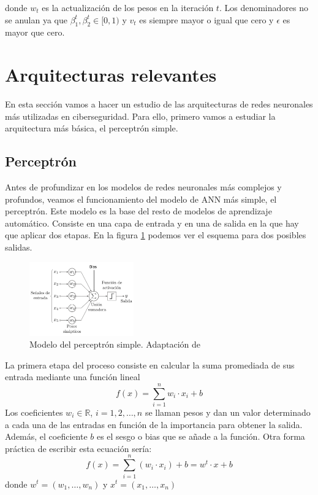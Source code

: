 donde $w_t$ es la actualización de los pesos en la iteración $t$. Los denominadores no se anulan ya que $\beta_1^t,\beta_2^t \in [0, 1)$ y $v_t$ es siempre mayor o igual que cero y $\epsilon$ es mayor que cero.



\section{Arquitecturas relevantes} \label{Subsec: 3_2}

En esta sección vamos a hacer un estudio de las arquitecturas de redes neuronales más utilizadas en ciberseguridad. Para ello, primero vamos a estudiar la arquitectura más básica, el perceptrón simple.

\subsection{Perceptrón}

Antes de profundizar en los modelos de redes neuronales más complejos y profundos, veamos el funcionamiento del modelo de ANN más simple, el perceptrón. Este modelo es la base del resto de modelos de aprendizaje automático. Consiste en una capa de entrada y en una de salida en la que hay que aplicar dos etapas. En la figura \ref{img: perceptron} podemos ver el esquema para dos posibles salidas.

\begin{figure}[h!]
    \centering
    \includegraphics[width=0.4\textwidth]{img/perceptron.png}
    \caption{Modelo del perceptrón simple. Adaptación de \citep{percep}}
    \label{img: perceptron}
\end{figure}

La primera etapa del proceso consiste en calcular la suma promediada de sus entrada mediante una función lineal
\begin{equation}
f(x) = \sum_{i=1}^{n} w_i \cdot x_i + b
\end{equation}
Los coeficientes $w_i \in \mathbb{R}$, $i=1,2, \ldots, n$ se llaman pesos y dan un valor determinado a cada una de las entradas en función de la importancia para obtener la salida. Además, el coeficiente $b$ es el sesgo o bias que se añade a la función. Otra forma práctica de escribir esta ecuación sería:
\begin{equation}
    f(x) = \sum_{i=1}^{n} (w_i \cdot x_i) + b= w^t \cdot x + b
\end{equation}  
donde $w^t = (w_1, \ldots, w_n)$ y $x^t = (x_1, \ldots, x_n)$

